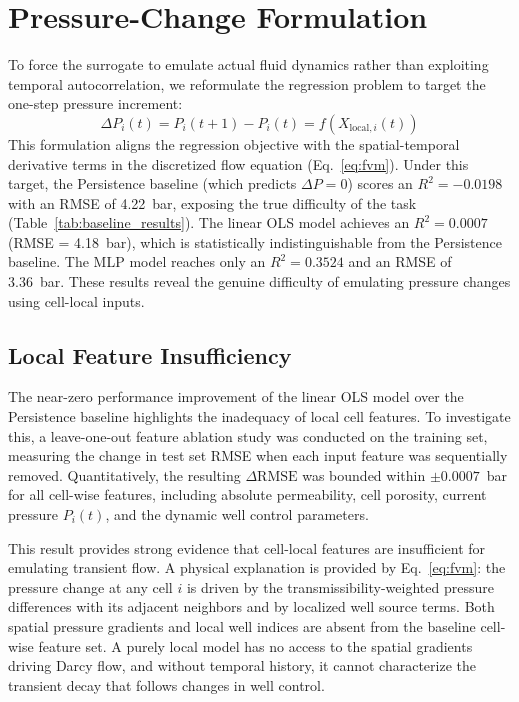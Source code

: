 \section{Pressure-Change Formulation}
To force the surrogate to emulate actual fluid dynamics rather than exploiting temporal autocorrelation, we reformulate the regression problem to target the one-step pressure increment:
\begin{equation}
\label{eq:delta_p_def}
\Delta P_i(t) = P_i(t+1) - P_i(t) = f(X_{\text{local}, i}(t))
\end{equation}
This formulation aligns the regression objective with the spatial-temporal derivative terms in the discretized flow equation (Eq.~\ref{eq:fvm}). Under this target, the Persistence baseline (which predicts $\Delta P = 0$) scores an $R^2 = -0.0198$ with an RMSE of 4.22~bar, exposing the true difficulty of the task (Table~\ref{tab:baseline_results}). The linear OLS model achieves an $R^2 = 0.0007$ (RMSE = 4.18~bar), which is statistically indistinguishable from the Persistence baseline. The MLP model reaches only an $R^2 = 0.3524$ and an RMSE of 3.36~bar. These results reveal the genuine difficulty of emulating pressure changes using cell-local inputs.

\subsection{Local Feature Insufficiency}
The near-zero performance improvement of the linear OLS model over the Persistence baseline highlights the inadequacy of local cell features. To investigate this, a leave-one-out feature ablation study was conducted on the training set, measuring the change in test set RMSE when each input feature was sequentially removed. Quantitatively, the resulting $\Delta \text{RMSE}$ was bounded within $\pm 0.0007$~bar for all cell-wise features, including absolute permeability, cell porosity, current pressure $P_i(t)$, and the dynamic well control parameters.

This result provides strong evidence that cell-local features are insufficient for emulating transient flow. A physical explanation is provided by Eq.~\ref{eq:fvm}: the pressure change at any cell $i$ is driven by the transmissibility-weighted pressure differences with its adjacent neighbors and by localized well source terms. Both spatial pressure gradients and local well indices are absent from the baseline cell-wise feature set. A purely local model has no access to the spatial gradients driving Darcy flow, and without temporal history, it cannot characterize the transient decay that follows changes in well control.
